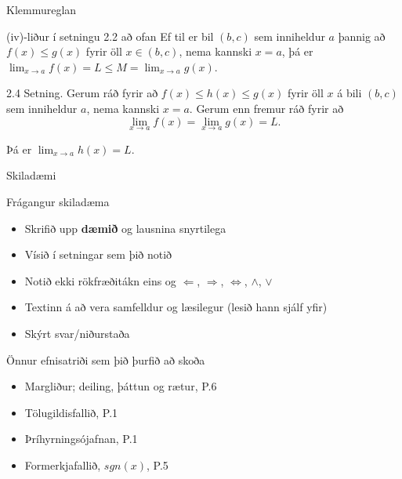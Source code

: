 \documentclass[icelandic,a4paper,12pt]{article}
\begin{document}
\begin{frame}{Klemmureglan}

\pause

\begin{block}{(iv)-liður í setningu 2.2 að ofan}
Ef til er bil $(b,c)$ sem inniheldur $a$ þannig að 
$f(x)\leq g(x)$ fyrir öll $x\in (b,c)$, nema kannski $x=a$, þá er
 $\lim_{x\rightarrow a}f(x)=L\leq M=\lim_{x\rightarrow a}g(x)$.
\end{block}

\pause

\begin{block}{2.4 Setning.}  Gerum ráð fyrir að $f(x)\leq
h(x)\leq g(x)$ fyrir öll $x$ á bili $(b, c)$ sem
inniheldur $a$, nema kannski $x=a$.  Gerum enn fremur ráð fyrir að 
$$\lim_{x\rightarrow a}f(x)=\lim_{x\rightarrow a}g(x)=L.$$

\pause

Þá er $\lim_{x\rightarrow a}h(x)=L$.
 \end{block}
\end{frame}


\begin{frame}{Skiladæmi}
 \begin{block}{Frágangur skiladæma}
 \begin{itemize}
 \item Skrifið upp {\bf dæmið} og lausnina snyrtilega
 \pause
 \item Vísið í setningar sem þið notið
 \pause
 \item Notið ekki rökfræðitákn eins og $\Leftarrow$, 
 $\Rightarrow$, $\Leftrightarrow$, $\wedge$, $\vee$
 \pause
 \item Textinn á að vera samfelldur og læsilegur (lesið hann 
 sjálf yfir)
 \pause
 \item Skýrt svar/niðurstaða
 \end{itemize}
 \end{block}
 
% 
 
\end{frame}

\begin{frame}{Önnur efnisatriði sem þið þurfið að skoða}

\begin{itemize}
\item Margliður; deiling, þáttun og rætur, P.6
\item Tölugildisfallið, P.1
\item Þríhyrningsójafnan, P.1
 \item Formerkjafallið, $sgn(x)$, P.5
\end{itemize}

 
\end{frame}
\end{document}
